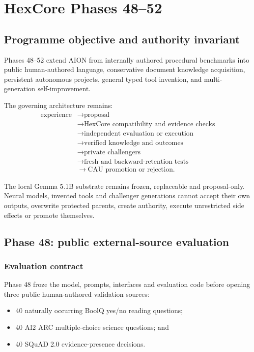\section{HexCore Phases 48--52}
\label{sec:hexcore-phases-48-52}

\subsection{Programme objective and authority invariant}

Phases 48--52 extend AION from internally authored procedural benchmarks into
public human-authored language, conservative document knowledge acquisition,
persistent autonomous projects, general typed tool invention, and
multi-generation self-improvement.

The governing architecture remains:
\[
\begin{aligned}
\text{experience}
&\rightarrow \text{proposal}\\
&\rightarrow \text{HexCore compatibility and evidence checks}\\
&\rightarrow \text{independent evaluation or execution}\\
&\rightarrow \text{verified knowledge and outcomes}\\
&\rightarrow \text{private challengers}\\
&\rightarrow \text{fresh and backward-retention tests}\\
&\rightarrow \text{CAU promotion or rejection}.
\end{aligned}
\]

The local Gemma 5.1B substrate remains frozen, replaceable and
proposal-only.  Neural models, invented tools and challenger generations
cannot accept their own outputs, overwrite protected parents, create
authority, execute unrestricted side effects or promote themselves.

\subsection{Phase 48: public external-source evaluation}
\label{subsec:phase48-public-external}

\subsubsection{Evaluation contract}

Phase 48 froze the model, prompts, interfaces and evaluation code before
opening three public human-authored validation sources:
\begin{itemize}
    \item 40 naturally occurring BoolQ yes/no reading questions;
    \item 40 AI2 ARC multiple-choice science questions; and
    \item 40 SQuAD 2.0 evidence-presence decisions.
\end{itemize}

